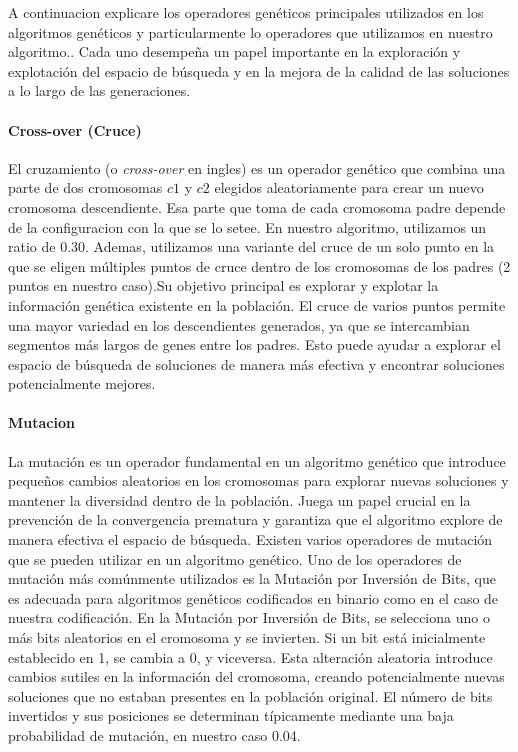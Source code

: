 A continuacion explicare los operadores genéticos principales utilizados en los algoritmos genéticos y particularmente lo operadores que utilizamos en nuestro algoritmo.. Cada uno desempeña un papel importante en la exploración y explotación del espacio de búsqueda y en la mejora de la calidad de las soluciones a lo largo de las generaciones.

\paragraph{Cross-over (Cruce)}

El cruzamiento (o \emph{cross-over} en ingles) es un operador genético que combina una parte de dos cromosomas $c1$ y $c2$ elegidos aleatoriamente para crear un nuevo cromosoma descendiente. Esa parte que toma de cada cromosoma padre depende de la configuracion con la que se lo setee. En nuestro algoritmo, utilizamos un ratio de 0.30. Ademas, utilizamos una variante del cruce de un solo punto en la que se eligen múltiples puntos de cruce dentro de los cromosomas de los padres (2 puntos en nuestro caso).Su objetivo principal es explorar y explotar la información genética existente en la población.
El cruce de varios puntos permite una mayor variedad en los descendientes generados, ya que se intercambian segmentos más largos de genes entre los padres. Esto puede ayudar a explorar el espacio de búsqueda de soluciones de manera más efectiva y encontrar soluciones potencialmente mejores.

\paragraph{Mutacion}

La mutación es un operador fundamental en un algoritmo genético que introduce pequeños cambios aleatorios en los cromosomas para explorar nuevas soluciones y mantener la diversidad dentro de la población. Juega un papel crucial en la prevención de la convergencia prematura y garantiza que el algoritmo explore de manera efectiva el espacio de búsqueda. Existen varios operadores de mutación que se pueden utilizar en un algoritmo genético. Uno de los operadores de mutación más comúnmente utilizados es la Mutación por Inversión de Bits, que es adecuada para algoritmos genéticos codificados en binario como en el caso de nuestra codificación.
En la Mutación por Inversión de Bits, se selecciona uno o más bits aleatorios en el cromosoma y se invierten. Si un bit está inicialmente establecido en 1, se cambia a 0, y viceversa. Esta alteración aleatoria introduce cambios sutiles en la información del cromosoma, creando potencialmente nuevas soluciones que no estaban presentes en la población original. El número de bits invertidos y sus posiciones se determinan típicamente mediante una baja probabilidad de mutación, en nuestro caso 0.04.


